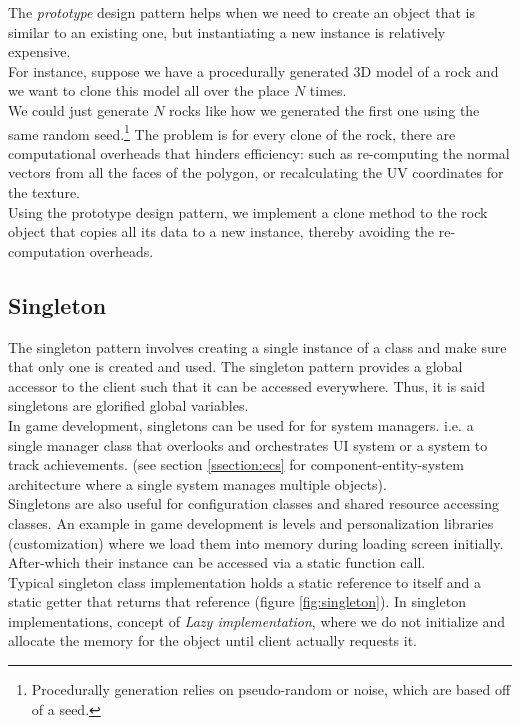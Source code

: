 \begin{multicols}{2}
The \textit{prototype} design pattern helps when we need to create an object that is similar to an existing one, but instantiating a new instance is relatively expensive.\bs
\\
For instance, suppose we have a procedurally generated 3D model of a rock and we want to clone this model all over the place $N$ times.\bs
\\
We could just generate $N$ rocks like how we generated the first one using the same random seed.\footnote{Procedurally generation relies on pseudo-random or noise, which are based off of a seed.} The problem is for every clone of the rock, there are computational overheads that hinders efficiency: such as re-computing the normal vectors from all the faces of the polygon, or recalculating the UV coordinates for the texture.\bs
\\
Using the prototype design pattern, we implement a clone method to the rock object that copies all its data to a new instance, thereby avoiding the re-computation overheads.

\subsection{Singleton}

The singleton pattern involves creating a single instance of a class and make sure that only one is created and used\cite{tp-singleton}. The singleton pattern provides a global accessor to the client such that it can be accessed everywhere. Thus, it is said singletons are glorified global variables.\cite{ood-singleton, sm-singleton}\bs
\\
In game development, singletons can be used for for system managers. i.e. a single manager class that overlooks and orchestrates UI system or a system to track achievements. (see section \ref{ssection:ecs} for component-entity-system architecture where a single system manages multiple objects).\bs
\\
Singletons are also useful for configuration classes and shared resource accessing classes.\cite{ood-singleton} An example in game development is levels and personalization libraries (customization) where we load them into memory during loading screen initially. After-which their instance can be accessed via a static function call.\bs
\\
Typical singleton class implementation holds a static reference to itself and a static getter that returns that reference (figure \ref{fig:singleton}). In singleton implementations, concept of \textit{Lazy implementation}, where we do not initialize and allocate the memory for the object until client actually requests it.


\end{multicols}
